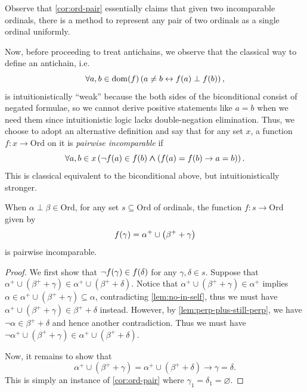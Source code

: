 \documentclass{asl}
\theoremstyle{plain}
\newcommand{\Ord}{\mathrm{Ord}}
\DeclareMathOperator{\dom}{dom}
\begin{document}
Observe that \autoref{cor:ord-pair} essentially claims that given two incomparable ordinals, there is a method to represent any pair of two ordinals as a single ordinal uniformly.

Now, before proceeding to treat antichains, we observe that the classical way to define an antichain, i.e.
\[\forall a, b \in \dom\mleft(f\mright) \left(a \neq b \leftrightarrow f\mleft(a\mright) \perp f\mleft(b\mright)\right),\]
is intuitionistically ``weak'' because the both sides of the biconditional consist of negated formulae, so we cannot derive positive statements like $a = b$ when we need them since intuitionistic logic lacks double-negation elimination. Thus, we choose to adopt an alternative definition and say that for any set $x$, a function $f : x \rightarrow \Ord$ on it is \emph{pairwise incomparable} if
\[\forall a, b \in x \left(\neg f\mleft(a\mright) \in f\mleft(b\mright) \land \left(f\mleft(a\mright) = f\mleft(b\mright) \rightarrow a = b\right)\right).\]
This is classical equivalent to the biconditional above, but intuitionistically stronger.

\begin{proposition}
  \label{prop:perp-ineq-to-perp}
  When $\alpha \perp \beta \in \Ord$, for any set $s \subseteq \Ord$ of ordinals, the function $f : s \rightarrow \Ord$ given by
  \[f\mleft(\gamma\mright) = \alpha^+ \cup \left(\beta^+ + \gamma\right)\]
  is pairwise incomparable.
\end{proposition}

\begin{proof}
  We first show that $\neg f\mleft(\gamma\mright) \in f\mleft(\delta\mright)$ for any $\gamma, \delta \in s$. Suppose that $\alpha^+ \cup \left(\beta^+ + \gamma\right) \in \alpha^+ \cup \left(\beta^+ + \delta\right)$. Notice that $\alpha^+ \cup \left(\beta^+ + \gamma\right) \in \alpha^+$ implies $\alpha \in \alpha^+ \cup \left(\beta^+ + \gamma\right) \subseteq \alpha$, contradicting \autoref{lem:no-in-self}, thus we must have $\alpha^+ \cup \left(\beta^+ + \gamma\right) \in \beta^+ + \delta$ instead. However, by \autoref{lem:perp-plus-still-perp}, we have $\neg \alpha \in \beta^+ + \delta$ and hence another contradiction. Thus we must have $\neg \alpha^+ \cup \left(\beta^+ + \gamma\right) \in \alpha^+ \cup \left(\beta^+ + \delta\right)$.

  Now, it remains to show that
  \[\alpha^+ \cup \left(\beta^+ + \gamma\right) = \alpha^+ \cup \left(\beta^+ + \delta\right) \rightarrow \gamma = \delta.\]
  This is simply an instance of \autoref{cor:ord-pair} where $\gamma_1 = \delta_1 = \varnothing$.
\end{proof}
\end{document}
